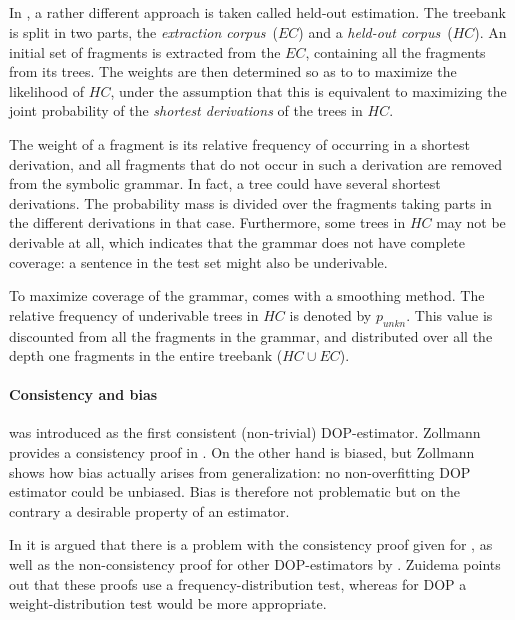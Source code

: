 \subsection{\dops}
In \dops{} \cite{zollmann2005}, a rather different approach is taken called held-out estimation. The treebank is split in two parts, the \emph{extraction corpus}~($EC$) and a \emph{held-out corpus}~($HC$). An initial set of fragments is extracted from the $EC$, containing all the fragments from its trees. The weights are then determined so as to to maximize the likelihood of $HC$, under the assumption that this is equivalent to maximizing the joint probability of the \emph{shortest derivations} of the trees in $HC$. 

The weight of a fragment is its relative frequency of occurring in a shortest derivation, and all fragments that do not occur in such a derivation are removed from the symbolic grammar. In fact, a tree could have several shortest derivations. The probability mass is divided over the fragments taking parts in the different derivations in that case. Furthermore, some trees in $HC$ may not be derivable at all, which indicates that the grammar does not have complete coverage: a sentence in the test set might also be underivable. 

To maximize coverage of the grammar, \dops{} comes with a smoothing method. The relative frequency of underivable trees in $HC$ is denoted by $p_{unkn}$. This value is discounted from all the fragments in the grammar, and distributed over all the depth one fragments in the entire treebank ($HC\cup EC$).


\paragraph{Consistency and bias}
\dops{} was introduced as the first consistent (non-trivial) DOP-estimator. Zollmann provides a consistency proof in \cite{zollmann2005}. On the other hand \dops{} is  biased, but Zollmann shows how bias actually arises from generalization: no non-overfitting DOP estimator could be unbiased. Bias is therefore not problematic but on the contrary a desirable property of an estimator.

In \cite{zuidema2006} it is argued that there is a problem with the consistency proof given for \dops{}, as well as the non-consistency proof for other DOP-estimators by \cite{johnson2002}. Zuidema points out that these proofs use a frequency-distribution test, whereas for DOP a weight-distribution test would be more appropriate. 






















